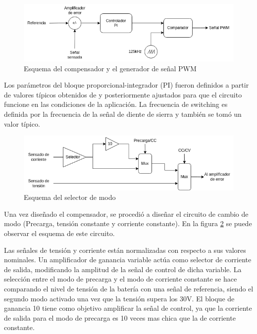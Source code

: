 \begin{figure}
    \centering
    \includegraphics[width=\textwidth]{images/compensador.png}
    \caption{Esquema del compensador y el generador de señal PWM}
    \label{fig:esquema_compensador}
\end{figure}

Los parámetros del bloque proporcional-integrador (PI) fueron definidos a partir de valores típicos obtenidos de \cite{mohan}
y posteriormente ajustados para que el circuito funcione en las condiciones de la aplicación.
La frecuencia de switching es definida por la frecuencia de la señal de diente de sierra y también se tomó un valor típico.

\begin{figure}
    \centering
    \includegraphics[width=\textwidth]{images/selector.png}
    \caption{Esquema del selector de modo}
    \label{fig:esquema_selector}
\end{figure}

Una vez diseñado el compensador, se procedió a diseñar el circuito de cambio de modo (Precarga, tensión constante y corriente constante).
En la figura \ref{fig:esquema_selector} se puede observar el esquema de este circuito.

Las señales de tensión y corriente están normalizadas con respecto a sus valores nominales.
Un amplificador de ganancia variable actúa como selector de corriente de salida,
modificando la amplitud de la señal de control de dicha variable.
La selección entre el modo de precarga y el modo de corriente constante se hace comparando el nivel de tensión de la batería
con una señal de referencia, siendo el segundo modo activado una vez que la tensión supera los 30V.
El bloque de ganancia 10 tiene como objetivo amplificar la señal de control, ya que la corriente de salida para el modo
de precarga es 10 veces mas chica que la de corriente constante.

